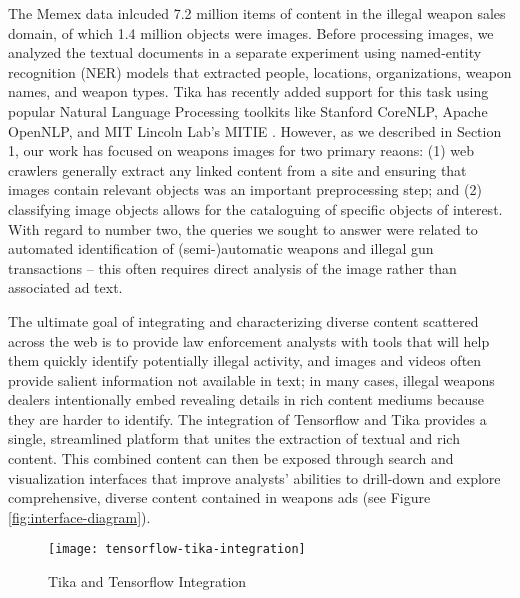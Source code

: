 The Memex data inlcuded 7.2 million items of content in the illegal weapon sales domain, of which 1.4 million objects were images. Before processing images, we analyzed the textual documents in a separate experiment using named-entity recognition (NER) models that extracted people, locations, organizations, weapon names, and weapon types. Tika has recently added support for this task using popular Natural Language Processing toolkits like Stanford CoreNLP\cite{Finkel:2005:INI:1219840.1219885}, Apache OpenNLP\cite{ApacheOpenNLP}, and MIT Lincoln Lab's MITIE \cite{MITIE-github}. However, as we described in Section 1, our work has focused on weapons images for two primary reaons: (1) web crawlers generally extract any linked content from a site and ensuring that images contain relevant objects was an important preprocessing step; and (2) classifying image objects allows for the cataloguing of specific objects of interest. 
With regard to number two, the queries we sought to answer were related to automated identification of (semi-)automatic weapons and illegal gun transactions -- this often requires direct analysis of the image rather than associated ad text. 

The ultimate goal of integrating and characterizing diverse content scattered across the web is to provide law enforcement analysts with tools that will help them quickly identify potentially illegal activity, and images and videos often provide salient information not available in text; in many cases, illegal weapons dealers intentionally embed revealing details in rich content mediums because they are harder to identify. The integration of Tensorflow and Tika provides a single, streamlined platform that unites the extraction of textual and rich content. This combined content can then be exposed through search and visualization interfaces that improve analysts' abilities to drill-down and explore comprehensive, diverse content contained in weapons ads (see Figure \ref{fig:interface-diagram}). 


\begin{figure*}[!t]
        \texttt{[image: tensorflow-tika-integration]}
        \caption{Tika and Tensorflow Integration}
        \label{fig:tf-tika-integration}
\end{figure*}

